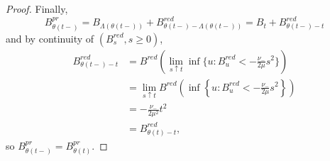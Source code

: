 \begin{proof}
Finally, 
$$B^{pr}_{\theta(t-)}=B_{\Lambda(\theta(t-))}+B^{red}_{\theta(t-)-\Lambda(\theta(t-))}
=B_{t}+B^{red}_{\theta(t-)-t}$$
and by continuity of $(B^{red}_s,s\geq 0)$,
\begin{align*}B^{red}_{\theta(t-)-t}&=B^{red}\left({\lim_{s\uparrow t}\inf\{u:B^{red}_u<-\frac{\nu_-}{2\mu} s^2\}}\right)\\&=\lim_{s\uparrow t} B^{red}\left({\inf\left\{u:B^{red}_u<-\frac{\nu_-}{2\mu} s^2\right\}}\right)\\&= -\frac{\nu_-}{2\mu^2}t^2\\
&=B^{red}_{\theta(t)-t}, \end{align*}
so 
$B^{pr}_{\theta(t-)}=B^{pr}_{\theta(t)}.$
\end{proof}